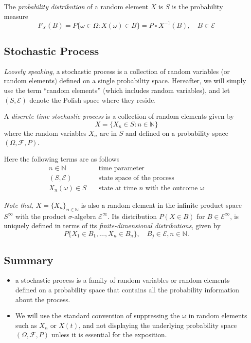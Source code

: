 \documentclass[twoside]{article}
\theoremstyle{definition}
\theoremstyle{remark}
\theoremstyle{remark}
\begin{document}
The \textit{probability distribution} of a random element $X$ is $S$ is the
probability measure
\begin{equation}
  F_X(B) = P{\{ \omega \in \Omega : X(\omega) \in B \}} = P \circ X^{-1} (B), \quad B \in \mathcal{E}
\end{equation}

\subsection{Stochastic Process}
\textit{Loosely speaking}, a stochastic process is a collection of random
variables (or random elements) defined on a single probability space.
Hereafter, we will simply use the term ``random elements'' (which includes
random variables), and let $(S, \mathcal{E})$ denote the Polish space where
they reside.

A \textit{discrete-time stochastic process} is a collection of random elements
given by
\begin{equation}
  X = {\{ X_n \in S : n \in \mathbb{N} \}}
\end{equation}
where the random variables $X_n$ are in $S$ and defined on a probability
space $(\Omega, \mathcal{F}, P)$.

Here the following terms are as follows
\begin{equation*}
  \begin{array}{ll}
    n \in \mathbb{N}  & \quad \textrm{time parameter} \\
    (S, \mathcal{E})  & \quad \textrm{state space of the process} \\
    X_n(\omega) \in S & \quad \textrm{state at time $n$ with the outcome $\omega$}
  \end{array}
\end{equation*}


\textit{Note that}, $X = {\{X_n\}}_{n \in \mathbb{N}}$ is also a random element
in the infinite product space $S^{\infty}$ with the product $\sigma$-algebra
$\mathcal{E}^{\infty}$. Its distribution $P(X \in B)$ for $B \in \mathcal{E}^{\infty}$,
is uniquely defined in terms of its \textit{finite-dimensional distributions},
given by
\begin{equation}
  P{\{ X_1 \in B_1, \ldots, X_n \in B_n \}}, \quad B_j \in \mathcal{E}, n \in \mathbb{N}.
\end{equation}


\subsection{Summary}
\begin{itemize}
  \item a stochastic process is a family of random variables or random elements
  defined on a probability space that contains all the probability information
  about the process.
  \item We will use the standard convention of suppressing the $\omega$ in
  random elements such as $X_n$ or $X(t)$, and not displaying the underlying
  probability space $(\Omega, \mathcal{F}, P)$ unless it is essential for the
  exposition.
\end{itemize}
\end{document}
